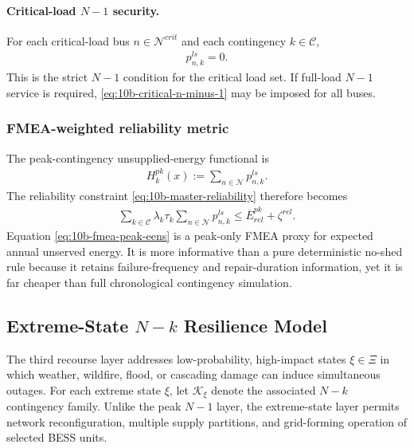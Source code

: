 \paragraph{Critical-load \texorpdfstring{$N{-}1$}{N-1} security.}
For each critical-load bus \(n\in\mathcal{N}^{crit}\) and each contingency \(k\in\mathcal{C}\),
\begin{align}
p_{n,k}^{ls} = 0.
\label{eq:10b-critical-n-minus-1}
\end{align}
This is the strict \(N{-}1\) condition for the critical load set. If full-load \(N{-}1\) service is required, \eqref{eq:10b-critical-n-minus-1} may be imposed for all buses.

\subsubsection{FMEA-weighted reliability metric}

The peak-contingency unsupplied-energy functional is
\begin{align}
H_k^{pk}(x) := \sum_{n\in\mathcal{N}} p_{n,k}^{ls}.
\label{eq:10b-peak-shed-functional}
\end{align}
The reliability constraint \eqref{eq:10b-master-reliability} therefore becomes
\begin{align}
\sum_{k\in\mathcal{C}} \lambda_k\tau_k
\sum_{n\in\mathcal{N}} p_{n,k}^{ls}
\le \overline E^{pk}_{rel} + \zeta^{rel}.
\label{eq:10b-fmea-peak-eens}
\end{align}
Equation \eqref{eq:10b-fmea-peak-eens} is a peak-only FMEA proxy for expected annual unserved energy. It is more informative than a pure deterministic no-shed rule because it retains failure-frequency and repair-duration information, yet it is far cheaper than full chronological contingency simulation.

\subsection{Extreme-State \texorpdfstring{$N{-}k$}{N-k} Resilience Model}

The third recourse layer addresses low-probability, high-impact states \(\xi\in\Xi\) in which weather, wildfire, flood, or cascading damage can induce simultaneous outages. For each extreme state \(\xi\), let \(\mathcal{K}_\xi\) denote the associated \(N{-}k\) contingency family. Unlike the peak \(N{-}1\) layer, the extreme-state layer permits network reconfiguration, multiple supply partitions, and grid-forming operation of selected BESS units.

